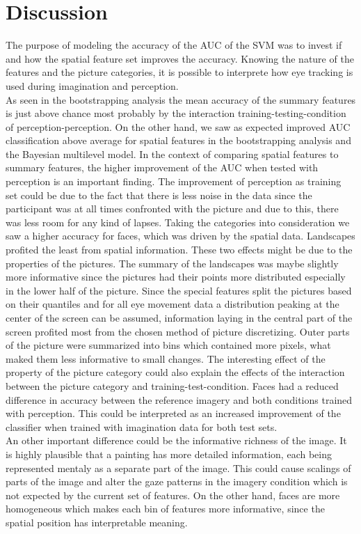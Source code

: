 \documentclass[a4paper,man,natbib,floatsintext]{apa6}
\begin{document}
\section{Discussion}
The purpose of modeling the accuracy of the AUC of the SVM was to invest if and how the spatial feature set improves the accuracy. Knowing the nature of the features and the picture categories, it is possible to interprete how eye tracking is used during imagination and perception. \\
As seen in the bootstrapping analysis the mean accuracy of the summary features is just above chance most probably by the interaction training-testing-condition of perception-perception.
On the other hand, we saw as expected improved AUC classification above average for spatial features in the bootstrapping analysis and the Bayesian multilevel model.
In the context of comparing spatial features to summary features, the higher improvement of the AUC when tested with perception is an important finding. The improvement of perception as training set could be due to the fact that there is less noise in the data since the participant was at all times confronted with the picture and due to this, there was less room for any kind of lapses.
Taking the categories into consideration we saw a higher accuracy for faces, which was driven by the spatial data. Landscapes profited the least from spatial information. These two effects might be due to the properties of the pictures. The summary of the landscapes was maybe slightly more informative since the pictures had their points more distributed especially in the lower half of the picture. Since the special features split the pictures based on their quantiles and for all eye movement data a distribution peaking at the center of the screen can be assumed, information laying in the central part of the screen profited most from the chosen method of picture discretizing. Outer parts of the picture were summarized into bins which contained more pixels, what maked them less informative to small changes. 
The interesting effect of the property of the picture category could also explain the effects of the interaction between the picture category and training-test-condition. Faces had a reduced difference in accuracy between the reference imagery and both conditions trained with perception. This could be interpreted as an increased improvement of the classifier when trained with imagination data for both test sets. \\
An other important difference could be the informative richness of the image. It is highly plausible that a painting has more detailed information, each being represented mentaly as a separate part of the image. This could cause scalings of parts of the image and alter the gaze patterns in the imagery condition which is not expected by the current set of features. On the other hand, faces are more homogeneous which makes each bin of features more informative, since the spatial position has interpretable meaning. \\
\end{document}
